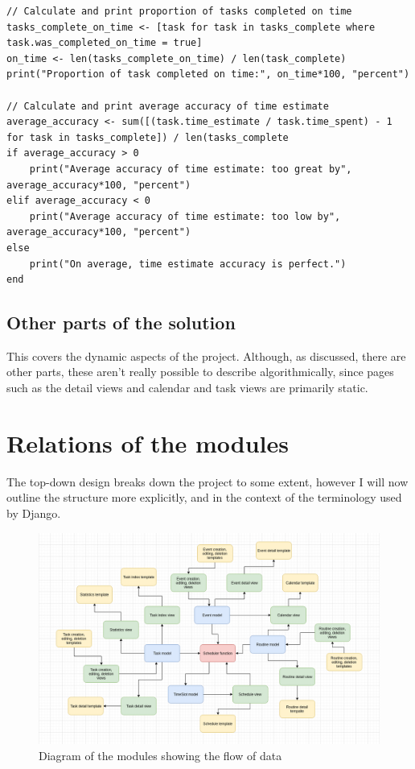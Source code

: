 \documentclass{article}
\begin{document}
\begin{lstlisting}[breaklines]
// Calculate and print proportion of tasks completed on time
tasks_complete_on_time <- [task for task in tasks_complete where task.was_completed_on_time = true]
on_time <- len(tasks_complete_on_time) / len(task_complete)
print("Proportion of task completed on time:", on_time*100, "percent")

// Calculate and print average accuracy of time estimate
average_accuracy <- sum([(task.time_estimate / task.time_spent) - 1 for task in tasks_complete]) / len(tasks_complete
if average_accuracy > 0
    print("Average accuracy of time estimate: too great by", average_accuracy*100, "percent")
elif average_accuracy < 0
    print("Average accuracy of time estimate: too low by", average_accuracy*100, "percent")
else
    print("On average, time estimate accuracy is perfect.")
end
\end{lstlisting}

\subsection{Other parts of the solution}
This covers the dynamic aspects of the project.
Although, as discussed, there are other parts,
these aren't really possible to describe algorithmically,
since pages such as the detail views and calendar and task views are primarily static.

\section{Relations of the modules}
The top-down design breaks down the project to some extent,
however I will now outline the structure more explicitly,
and in the context of the terminology used by Django.

\begin{figure}[H]
	\centering
	\includegraphics[width=\linewidth]{Screenshots/mytime_modular_design.png}
	\caption{Diagram of the modules showing the flow of data}
	\label{fig:modular_design}
\end{figure}
\end{document}
